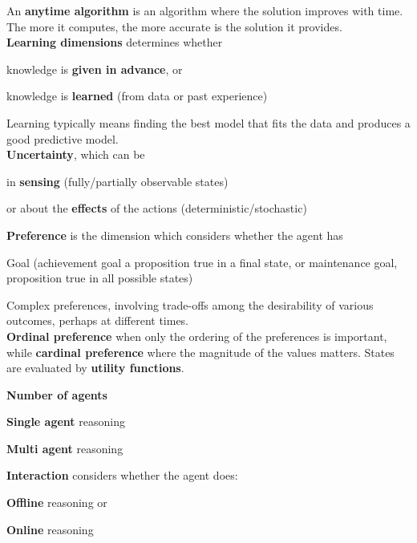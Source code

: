 \documentclass[10pt]{report}
\begin{document}
An \textbf{anytime algorithm} is an algorithm where the solution improves with time. The more it computes, the more accurate is the solution it provides.\\
\textbf{Learning dimensions} determines whether \begin{list}{}{}
	\item knowledge is \textbf{given in advance}, or
	\item knowledge is \textbf{learned} (from data or past experience)
\end{list}
Learning typically means finding the best model that fits the data and produces a good predictive model.\\
\textbf{Uncertainty}, which can be \begin{list}{}{}
	\item in \textbf{sensing} (fully/partially observable states)
	\item or about the \textbf{effects} of the actions (deterministic/stochastic)
\end{list}
\textbf{Preference} is the dimension which considers whether the agent has
\begin{list}{}{}
	\item Goal (achievement goal a proposition true in a final state, or maintenance goal, proposition true in all possible states)
	\item Complex preferences, involving trade-offs among the desirability of various outcomes, perhaps at different times.\\
	\textbf{Ordinal preference} when only the ordering of the preferences is important, while \textbf{cardinal preference} where the magnitude of the values matters. States are evaluated by \textbf{utility functions}.
\end{list}
\pagebreak
\textbf{Number of agents}\begin{list}{}{}
	\item \textbf{Single agent} reasoning
	\item \textbf{Multi agent} reasoning
\end{list}
\textbf{Interaction} considers whether the agent does:
\begin{list}{}{}
	\item \textbf{Offline} reasoning or
	\item \textbf{Online} reasoning
\end{list}
\end{document}
